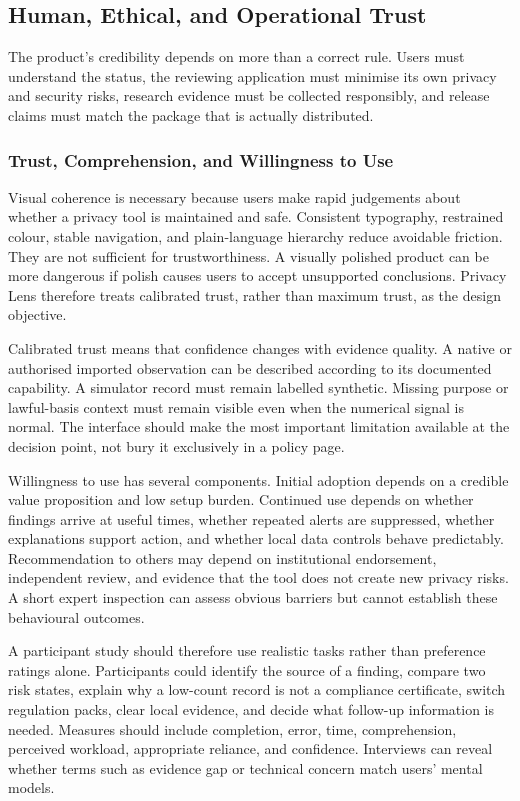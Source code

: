 \subsection{Human, Ethical, and Operational Trust}

The product's credibility depends on more than a correct rule. Users must understand the status, the reviewing application must minimise its own privacy and security risks, research evidence must be collected responsibly, and release claims must match the package that is actually distributed.

\subsubsection{Trust, Comprehension, and Willingness to Use}

Visual coherence is necessary because users make rapid judgements about whether a privacy tool is maintained and safe. Consistent typography, restrained colour, stable navigation, and plain-language hierarchy reduce avoidable friction. They are not sufficient for trustworthiness. A visually polished product can be more dangerous if polish causes users to accept unsupported conclusions. Privacy Lens therefore treats calibrated trust, rather than maximum trust, as the design objective.

Calibrated trust means that confidence changes with evidence quality. A native or authorised imported observation can be described according to its documented capability. A simulator record must remain labelled synthetic. Missing purpose or lawful-basis context must remain visible even when the numerical signal is normal. The interface should make the most important limitation available at the decision point, not bury it exclusively in a policy page.

Willingness to use has several components. Initial adoption depends on a credible value proposition and low setup burden. Continued use depends on whether findings arrive at useful times, whether repeated alerts are suppressed, whether explanations support action, and whether local data controls behave predictably. Recommendation to others may depend on institutional endorsement, independent review, and evidence that the tool does not create new privacy risks. A short expert inspection can assess obvious barriers but cannot establish these behavioural outcomes.

A participant study should therefore use realistic tasks rather than preference ratings alone. Participants could identify the source of a finding, compare two risk states, explain why a low-count record is not a compliance certificate, switch regulation packs, clear local evidence, and decide what follow-up information is needed. Measures should include completion, error, time, comprehension, perceived workload, appropriate reliance, and confidence. Interviews can reveal whether terms such as evidence gap or technical concern match users' mental models.


